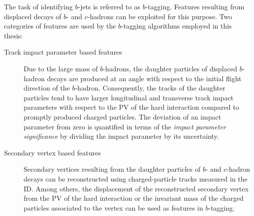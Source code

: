 The task of identifying $b$-jets is referred to as $b$-tagging. Features
resulting from displaced decays of $b$- and $c$-hadrons can be exploited for
this purpose. Two categories of features are used by the $b$-tagging algorithms
employed in this thesis:
\begin{description}

\item[Track impact parameter based features] Due to the large mass of
  $b$-hadrons, the daughter particles of displaced $b$-hadron decays are
  produced at an angle with respect to the initial flight direction of the
  $b$-hadron. Consequently, the tracks of the daughter particles tend to have
  larger longitudinal and transverse track impact parameters with respect to the
  PV of the hard interaction compared to promptly produced charged
  particles. The deviation of an impact parameter from zero is quantified in
  terms of the \emph{impact parameter significance} by dividing the impact
  parameter by its uncertainty.

\item[Secondary vertex based features] Secondary vertices resulting from the
  daughter particles of $b$- and $c$-hadron decays can be reconstructed using
  charged-particle tracks measured in the ID. Among others, the displacement of
  the reconstructed secondary vertex from the PV of the hard interaction or the
  invariant mass of the charged particles associated to the vertex can be used
  as features in $b$-tagging.
\end{description}



